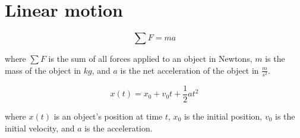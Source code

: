 \section{Linear motion}

\begin{equation*}
  \sum F = ma
\end{equation*}

where $\sum F$ is the sum of all forces applied to an object in Newtons, $m$ is
the mass of the object in $kg$, and $a$ is the net acceleration of the object in
$\frac{m}{s^2}$.

\begin{equation*}
  x(t) = x_0 + v_0 t + \frac{1}{2}at^2
\end{equation*}

where $x(t)$ is an object's position at time $t$, $x_0$ is the initial position,
$v_0$ is the initial velocity, and $a$ is the acceleration.
